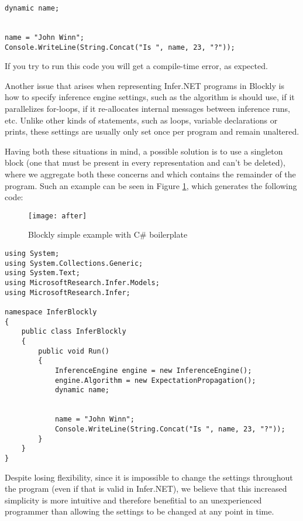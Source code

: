 \begin{lstlisting}
dynamic name;


name = "John Winn";
Console.WriteLine(String.Concat("Is ", name, 23, "?"));
\end{lstlisting}

If you try to run this code you will get a compile-time error, as expected.

Another issue that arises when representing Infer.NET programs in Blockly is how
to specify inference engine settings, such as the algorithm is should use, if it
parallelizes for-loops, if it re-allocates internal messages between inference
runs, etc. Unlike other kinds of statements, such as loops, variable declarations
or prints, these settings are usually only set once per program and remain
unaltered.

Having both these situations in mind, a possible solution is to use a singleton
block (one that must be present in every representation and can't be deleted),
where we aggregate both these concerns and which contains the remainder of the program.
Such an example can be seen in Figure \ref{fig:after}, which generates the following code:

\begin{figure}[t]
  \begin{center}
    \leavevmode
    \texttt{[image: after]}
    \caption{Blockly simple example with C# boilerplate}
    \label{fig:after}
  \end{center}
\end{figure}

\begin{lstlisting}
using System;
using System.Collections.Generic;
using System.Text;
using MicrosoftResearch.Infer.Models;
using MicrosoftResearch.Infer;

namespace InferBlockly
{
	public class InferBlockly
	{
		public void Run()
		{
			InferenceEngine engine = new InferenceEngine();
			engine.Algorithm = new ExpectationPropagation();
			dynamic name;


			name = "John Winn";
			Console.WriteLine(String.Concat("Is ", name, 23, "?"));
		}
	}
}
\end{lstlisting}

Despite losing flexibility, since it is impossible to change the settings
throughout the program (even if that is valid in Infer.NET),
we believe that this increased simplicity is more intuitive and therefore benefitial to an unexperienced
programmer than allowing the settings to be changed at any point in time.

